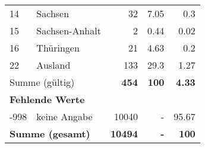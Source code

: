 \begin{longtable}{lXrrr}
     14 &
     \multicolumn{1}{X}{ Sachsen   } &


       \num{32} &
       \num[round-mode=places,round-precision=2]{7,05} &
         \num[round-mode=places,round-precision=2]{0,3} \\

     15 &
     \multicolumn{1}{X}{ Sachsen-Anhalt   } &


       \num{2} &
       \num[round-mode=places,round-precision=2]{0,44} &
         \num[round-mode=places,round-precision=2]{0,02} \\

     16 &
     \multicolumn{1}{X}{ Thüringen   } &


       \num{21} &
       \num[round-mode=places,round-precision=2]{4,63} &
         \num[round-mode=places,round-precision=2]{0,2} \\

     22 &
     \multicolumn{1}{X}{ Ausland   } &


       \num{133} &
       \num[round-mode=places,round-precision=2]{29,3} &
         \num[round-mode=places,round-precision=2]{1,27} \\
     \midrule
     \multicolumn{2}{l}{Summe (gültig)} &
       \textbf{\num{454}} &
     \textbf{100} &
       \textbf{\num[round-mode=places,round-precision=2]{4,33}} \\
     \multicolumn{5}{l}{\textbf{Fehlende Werte}}\\
       -998 &
       keine Angabe &
         \num{10040} &
        - &
         \num[round-mode=places,round-precision=2]{95,67} \\
     \midrule
     \multicolumn{2}{l}{\textbf{Summe (gesamt)}} &
          \textbf{\num{10494}} &
        \textbf{-} &
        \textbf{100} \\
     \bottomrule
     \end{longtable}
     

